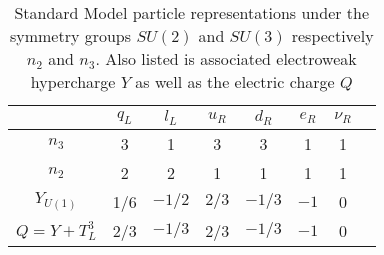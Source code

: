 \begin{center}
\begin{table}[]
\begin{center}
\caption{Standard Model particle representations under the symmetry groups $SU(2)$ and $SU(3)$ respectively $n_2$ and $n_3$. Also listed is associated electroweak hypercharge $Y$ as well as the electric charge $Q$ }
\begin{tabular}{cccccccc}
                & $q_L$ & $l_L$  & $u_R$ & $d_R$  & $e_R$ & $\nu_R$ \\
\hline
$n_3$           & 3     & 1      & 3     & 3      & 1     & 1       \\
$n_2$           & 2     & 2      & 1     & 1      & 1     & 1       \\
$Y_{U(1)}$      & 1/6   & $-1/2$ & $2/3$ & $-1/3$ & $-1$  & 0       \\
\hline
\hline
$Q = Y + T_L^3$ & 2/3   & $-1/3$ & 2/3   & $-1/3$ & $-1$  & 0
\end{tabular}
\end{center}
\end{table}
\end{center}
